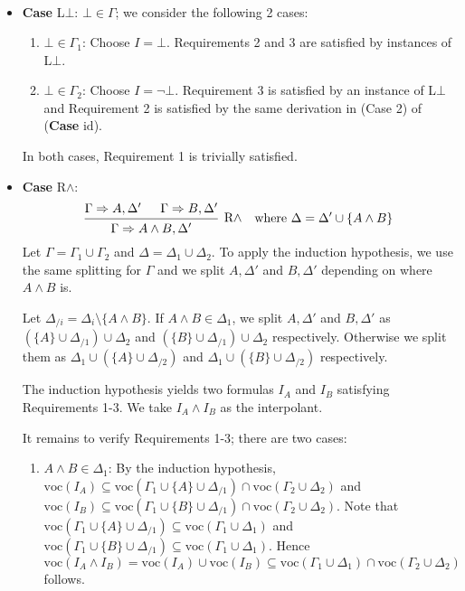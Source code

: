 \documentclass[a4paper]{article}
\newcommand{\voc}{\mathrm{voc}}
\newcommand{\id}{\mathrm{id}}
\begin{document}
\begin{itemize}
\begin{enumerate}
\begin{align*}
    \end{align*}
  \end{enumerate}
\item \textbf{Case} L$\bot$: $\bot \in \Gamma$; we consider the following 2 cases:
  \begin{enumerate}
  \item $\bot \in \Gamma_1$: Choose $I = \bot$.
    Requirements 2 and 3 are satisfied by instances of L$\bot$.
  \item $\bot \in \Gamma_2$: Choose $I = \lnot\bot$.
    Requirement 3 is satisfied by an instance of L$\bot$ and Requirement 2 is satisfied by the same derivation in (Case 2) of (\textbf{Case} $\id$).
  \end{enumerate}
  In both cases, Requirement 1 is trivially satisfied.
\item \textbf{Case} R$\wedge$:
  \begin{align*}
    \begin{prooftree}
      \hypo{\Gamma \Rightarrow A, \Delta'}
      \hypo{\Gamma \Rightarrow B, \Delta'}
      \infer2[R$\wedge$]{\Gamma \Rightarrow A \wedge B, \Delta'}
    \end{prooftree}
    && \text{where $\Delta = \Delta' \cup \{A \wedge B\}$}
  \end{align*}
  Let $\Gamma = \Gamma_1 \cup \Gamma_2$ and $\Delta = \Delta_1 \cup \Delta_2$.
  To apply the induction hypothesis, we use the same splitting for $\Gamma$ and we split $A,\Delta'$ and $B,\Delta'$ depending on where $A \wedge B$ is.

  Let $\Delta_{/i} = \Delta_{i} \setminus \{A \wedge B\}$.
  If $A \wedge B \in \Delta_1$, we split $A,\Delta'$ and $B,\Delta'$ as $(\{A\} \cup \Delta_{/1}) \cup \Delta_2$ and $(\{B\} \cup \Delta_{/1}) \cup \Delta_2$ respectively.
  Otherwise we split them as $\Delta_1 \cup (\{A\} \cup \Delta_{/2})$ and $\Delta_1 \cup (\{B\} \cup \Delta_{/2})$ respectively.

  The induction hypothesis yields two formulas $I_A$ and $I_B$ satisfying Requirements 1-3.
  We take $I_A \wedge I_B$ as the interpolant.

  It remains to verify Requirements 1-3; there are two cases:
  \begin{enumerate}
  \item $A \wedge B \in \Delta_1$: By the induction hypothesis, $\voc(I_A) \subseteq \voc(\Gamma_1 \cup \{A\} \cup \Delta_{/1}) \cap \voc(\Gamma_2 \cup \Delta_2)$ and $\voc(I_B) \subseteq \voc(\Gamma_1 \cup \{B\} \cup \Delta_{/1}) \cap \voc(\Gamma_2 \cup \Delta_2)$.
    Note that $\voc(\Gamma_1 \cup \{A\} \cup \Delta_{/1}) \subseteq \voc(\Gamma_1 \cup \Delta_1)$ and $\voc(\Gamma_1 \cup \{B\} \cup \Delta_{/1}) \subseteq \voc(\Gamma_1 \cup \Delta_1)$.
    Hence $\voc(I_A \wedge I_B) = \voc(I_A) \cup \voc(I_B) \subseteq \voc(\Gamma_1 \cup \Delta_1) \cap \voc(\Gamma_2 \cup \Delta_2)$ follows.


\end{enumerate}
\end{itemize}
\end{document}
